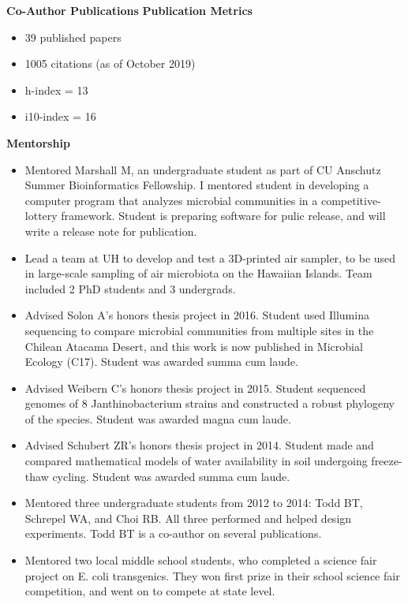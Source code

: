\documentclass{article}
\begin{document}
{\large  \textbf{Co-Author Publications}}
\vspace{-1em}\vspace{1mm}
\begingroup
  \setlength\bibitemsep{0pt}
  \nocite{*}
  \printbibliography[keyword=coauthor, heading=none]
\endgroup
%
\vspace{-1em}\vspace{3mm}
{\large  \textbf{Publication Metrics}}
\begin{adjustwidth}{5mm}{}
  \begin{multicols}{2}
    \begin{itemize}[noitemsep,topsep=0pt, leftmargin=0mm]
      \item 39 published papers
      \item 1005 citations (as of October 2019)
      \item h-index = 13
      \item i10-index = 16
    \end{itemize}
  \end{multicols}
\end{adjustwidth}
\vspace{3mm}
{\large  \textbf{Mentorship}}
\begin{itemize}[noitemsep,topsep=0pt, leftmargin=5mm]
  \item Mentored Marshall M, an undergraduate student as part of CU Anschutz Summer Bioinformatics Fellowship. I mentored student in developing a computer program that analyzes microbial communities in a competitive-lottery framework. Student is preparing software for pulic release, and will write a release note for publication.
  \item Lead a team at UH to develop and test a 3D-printed air sampler, to be used in large-scale sampling of air microbiota on the Hawaiian Islands. Team included 2 PhD students and 3 undergrads.
  \item Advised Solon A’s honors thesis project in 2016. Student used Illumina sequencing to compare microbial communities from multiple sites in the Chilean Atacama Desert, and this work is now published in Microbial Ecology (C17). Student was awarded summa cum laude.
  \item Advised Weibern C’s honors thesis project in 2015. Student sequenced genomes of 8 Janthinobacterium strains and constructed a robust phylogeny of the species. Student was awarded magna cum laude.
  \item Advised Schubert ZR’s honors thesis project in 2014. Student made and compared mathematical models of water availability in soil undergoing freeze-thaw cycling. Student was awarded summa cum laude.
  \item Mentored three undergraduate students from 2012 to 2014: Todd BT, Schrepel WA, and Choi RB. All three performed and helped design experiments. Todd BT is a co-author on several publications.
  \item Mentored two local middle school students, who completed a science fair project on E. coli transgenics. They won first prize in their school science fair competition, and went on to compete at state level.
\end{itemize}
\end{document}
